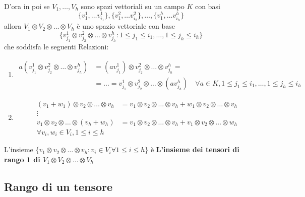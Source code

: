 \documentclass[../main.tex]{subfiles}
\begin{document}
D'ora in poi se $V_1, \ldots, V_h$ sono spazi vettoriali su un campo $K$ con basi
\begin{equation*}
    \{v_1^1, \ldots v_{i_1}^1\}, \{v_1^2, \ldots v_{i_2}^2\}, \ldots, \{v_1^h, \ldots v_{i_h}^h\}
\end{equation*}
allora $V_1 \otimes V_2 \otimes \ldots \otimes V_h$ è uno spazio vettoriale con base
\begin{equation*}
    \{v_{j_1}^1 \otimes v_{j_2}^2 \otimes \ldots \otimes v_{j_h}^h : 1 \leq j_1 \leq i_1, \ldots , 1 \leq j_h \leq i_h\}
\end{equation*}
che soddisfa le seguenti Relazioni:
\begin{enumerate}
    \item \begin{align*}
              a(v_{j_1}^1 \otimes v_{j_2}^2 \otimes \ldots \otimes v_{j_h}^h) & = (a v_{j_1}^1) \otimes v_{j_2}^2 \otimes \ldots \otimes v_{j_h}^h =                                                                                  \\
                                                                              & = \ldots = v_{j_1}^1 \otimes v_{j_2}^2 \otimes \ldots \otimes (a v_{j_h}^h) \quad \forall a \in K,  1 \leq j_1 \leq i_1, \ldots , 1 \leq j_h \leq i_h
          \end{align*}
    \item \begin{align*}
              (v_1 + w_1) \otimes v_2 \otimes \ldots \otimes v_h & = v_1 \otimes v_2 \otimes \ldots \otimes v_h + w_1 \otimes v_2 \otimes \ldots \otimes v_h \\
              \vdots                                                                                                                                         \\
              v_1 \otimes v_2 \otimes \ldots \otimes (v_h + w_h) & = v_1 \otimes v_2 \otimes \ldots \otimes v_h + v_1 \otimes v_2 \otimes \ldots \otimes w_h \\
              \forall v_i, w_i \in V_i, 1 \leq i \leq h
          \end{align*}
\end{enumerate}
L'insieme $\{v_1 \otimes v_2 \otimes \ldots \otimes v_h : v_i \in V_i \forall 1 \leq i \leq h\}$ è \textbf{L'insieme dei tensori di rango 1 di $V_1 \otimes V_2 \otimes \ldots \otimes V_h$}

\subsection{Rango di un tensore}
\end{document}
